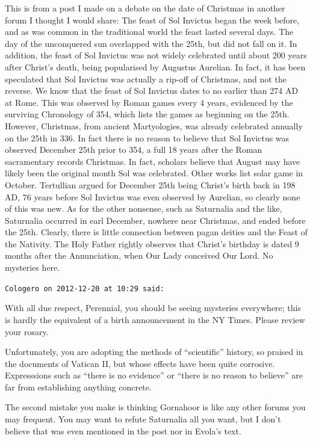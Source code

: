 \begin{footnotesize}
\begin{sffamily}
This is from a post I made on a debate on the date of Christmas in another forum I thought I would share: The feast of Sol Invictus began the week before, and as was common in the traditional world the feast lasted several days. The day of the unconquered sun overlapped with the 25th, but did not fall on it. In addition, the feast of Sol Invictus was not widely celebrated until about 200 years after Christ's death, being popularised by Augustus Aurelian. In fact, it has been speculated that Sol Invictus was actually a rip-off of Christmas, and not the reverse. We know that the feast of Sol Invictus dates to no earlier than 274 AD at Rome. This was observed by Roman games every 4 years, evidenced by the surviving Chronology of 354, which lists the games as beginning on the 25th. However, Christmas, from ancient Martyologies, was already celebrated annually on the 25th in 336. In fact there is no reason to believe that Sol Invictus was observed December 25th prior to 354, a full 18 years after the Roman sacramentary records Christmas. In fact, scholars believe that August may have likely been the original month Sol was celebrated. Other works list solar game in October. Tertullian argued for December 25th being Christ's birth back in 198 AD, 76 years before Sol Invictus was even observed by Aurelian, so clearly none of this was new. As for the other nonsense, such as Saturnalia and the like, Saturnalia occurred in earl December, nowhere near Christmas, and ended before the 25th. Clearly, there is little connection between pagan deities and the Feast of the Nativity. The Holy Father rightly observes that Christ's birthday is dated 9 months after the Annunciation, when Our Lady conceived Our Lord. No mysteries here.

\hfill

\texttt{Cologero on 2012-12-20 at 10:29 said:}

With all due respect, Perennial, you should be seeing mysteries everywhere; this is hardly the equivalent of a birth announcement in the NY Times. Please review your rosary.

Unfortunately, you are adopting the methods of ``scientific'' history, so praised in the documents of Vatican II, but whose effects have been quite corrosive. Expresssions such as ``there is no evidence'' or ``there is no reason to believe'' are far from establishing anything concrete.

The second mistake you make is thinking Gornahoor is like any other forums you may frequent. You may want to refute Saturnalia all you want, but I don't believe that was even mentioned in the post nor in Evola's text.


\end{sffamily}
\end{footnotesize}
